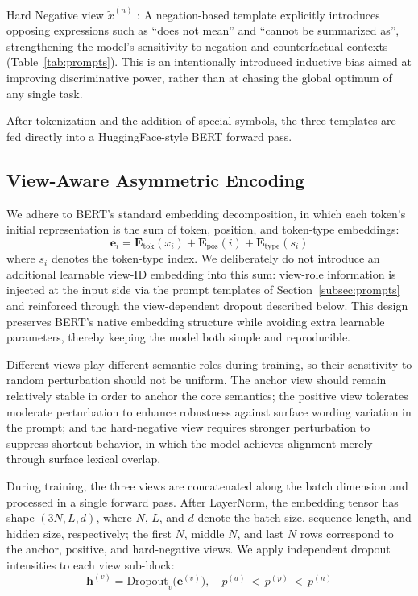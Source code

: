 \documentclass[a4paper,fleqn]{cas-dc}
\begin{document}
Hard Negative view $\tilde{x}^{(n)}$ : A negation-based template explicitly introduces opposing expressions such as ``does not mean'' and ``cannot be summarized as'', strengthening the model's sensitivity to negation and counterfactual contexts (Table~\ref{tab:prompts}). This is an intentionally introduced inductive bias aimed at improving discriminative power, rather than at chasing the global optimum of any single task.

After tokenization and the addition of special symbols, the three templates are fed directly into a HuggingFace-style BERT forward pass.

\subsection{View-Aware Asymmetric Encoding}
\label{subsec:encoding}

We adhere to BERT's standard embedding decomposition, in which each token's initial representation is the sum of token, position, and token-type embeddings:
\begin{equation}
\mathbf{e}_i = \mathbf{E}_{\mathrm{tok}}(x_i) + \mathbf{E}_{\mathrm{pos}}(i) + \mathbf{E}_{\mathrm{type}}(s_i)
\end{equation}
where $s_i$ denotes the token-type index. We deliberately do not introduce an additional learnable view-ID embedding into this sum: view-role information is injected at the input side via the prompt templates of Section~\ref{subsec:prompts} and reinforced through the view-dependent dropout described below. This design preserves BERT's native embedding structure while avoiding extra learnable parameters, thereby keeping the model both simple and reproducible.

Different views play different semantic roles during training, so their sensitivity to random perturbation should not be uniform. The anchor view should remain relatively stable in order to anchor the core semantics; the positive view tolerates moderate perturbation to enhance robustness against surface wording variation in the prompt; and the hard-negative view requires stronger perturbation to suppress shortcut behavior, in which the model achieves alignment merely through surface lexical overlap.

During training, the three views are concatenated along the batch dimension and processed in a single forward pass. After LayerNorm, the embedding tensor has shape $(3N, L, d)$, where $N$, $L$, and $d$ denote the batch size, sequence length, and hidden size, respectively; the first $N$, middle $N$, and last $N$ rows correspond to the anchor, positive, and hard-negative views. We apply independent dropout intensities to each view sub-block:
\begin{equation}
\mathbf{h}^{(v)} = \mathrm{Dropout}_v\bigl(\mathbf{e}^{(v)}\bigr), \quad p^{(a)} \,<\, p^{(p)} \,<\, p^{(n)}
\end{equation}
\end{document}
